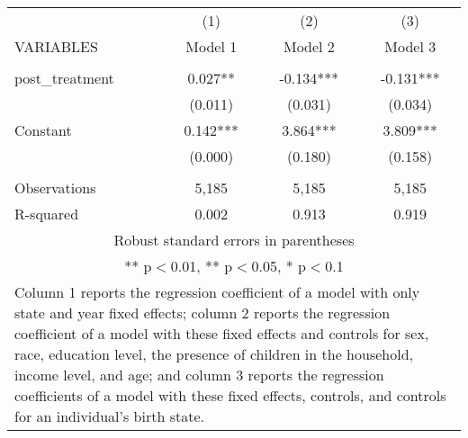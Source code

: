 \begin{tabular}{lccc}
\hline
 & (1) & (2) & (3) \\
VARIABLES & Model 1 & Model 2 & Model 3 \\ \hline
 &  &  &  \\
post\_treatment & 0.027** & -0.134*** & -0.131*** \\
 & (0.011) & (0.031) & (0.034) \\
Constant & 0.142*** & 3.864*** & 3.809*** \\
 & (0.000) & (0.180) & (0.158) \\
 &  &  &  \\
Observations & 5,185 & 5,185 & 5,185 \\
 R-squared & 0.002 & 0.913 & 0.919 \\ \hline
\multicolumn{4}{c}{\small Robust standard errors in parentheses} \\
\multicolumn{4}{c}{\small *** p$<$0.01, ** p$<$0.05, * p$<$0.1} \\
\multicolumn{4}{p{0.8\linewidth}}{\small Column 1 reports the
regression coefficient of a model with only state and year fixed effects; column 2 reports the
regression coefficient of a model with these fixed effects and controls for sex, race, education
level, the presence of children in the household, income level, and age; and column 3 reports
the regression coefficients of a model with these fixed effects, controls, and controls for an
individual’s birth state.} \\
\end{tabular}
